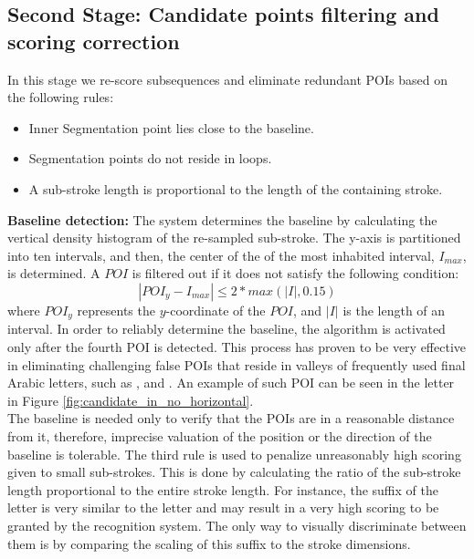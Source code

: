 \documentclass[10pt, conference, compsocconf]{IEEEtran}
\begin{document}
\subsection{Second Stage: Candidate points filtering and scoring correction}
In this stage we re-score subsequences and eliminate redundant POIs based on the following rules:

\begin{itemize}
	\item Inner Segmentation point lies close to the baseline. 
	\item Segmentation points do not reside in loops.
	\item A sub-stroke length is proportional to the length of the containing stroke.\\
\end{itemize}

\textbf{Baseline detection:} The system determines the baseline by calculating the vertical density histogram of the re-sampled sub-stroke. The y-axis is partitioned into ten intervals, and then, the center of the of the most inhabited interval, $I_{max}$, is determined. A $POI$ is filtered out if it does not satisfy the following condition:
\begin{equation}
|POI_y-I_{max}| \leq 2*max{({|I|},0.15)} 
\end{equation}
where $POI_y$ represents the $y$-coordinate of the $POI$, and $|I|$ is the length of an interval. In order to reliably determine the baseline, the algorithm is activated only after the fourth POI is detected. This process has proven to be very effective in eliminating challenging false POIs that reside in valleys of frequently used final Arabic letters, such as ,  and . An example of such POI can be seen in the letter  in Figure \ref{fig:candidate_in_no_horizontal}. \\

The baseline is needed only to verify that the POIs are in a reasonable distance from it, therefore, imprecise valuation of the position or the direction of the baseline is tolerable.
The third rule is used to penalize unreasonably high scoring given to small sub-strokes. 
This is done by calculating the ratio of the sub-stroke length proportional to the entire stroke length.
For instance, the suffix of the letter  is very similar to the letter  and may result in a very high scoring to be granted by the recognition system. 
The only way to visually discriminate between them is by comparing the scaling of this suffix to the stroke dimensions.\\
\end{document}
